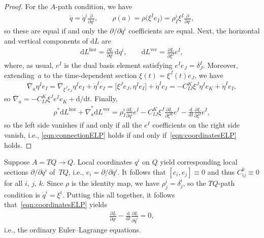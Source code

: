 \documentclass[pdftex]{sigma}
\numberwithin{equation}{section}
\begin{document}
\begin{proof}
 For the $A$-path condition, we have
 \begin{gather*}
 \dot{q} = \dot{q} ^i \frac{ \partial }{ \partial q ^i }, \qquad \rho(a) = \rho \big(\xi ^I e _I \big) = \rho ^i _I \xi ^I \frac{ \partial }{ \partial q ^i },
 \end{gather*}
 so these are equal if and only the $ \partial / \partial q ^i $ coef\/f\/icients are equal. Next, the horizontal and vertical components of $ \mathrm{d} L $ are
 \begin{gather*}
 \mathrm{d} L ^\text{hor} = \frac{ \partial L }{ \partial q ^i } \,\mathrm{d}q ^i , \qquad \mathrm{d} L ^\text{ver}= \frac{ \partial L }{ \partial \xi ^I } e ^I ,
 \end{gather*}
 where, as usual, $ e ^I $ is the dual basis element satisfying $ e ^I e _J = \delta ^I _J $. Moreover, extending~$a$ to the time-dependent section $ \xi (t) = \xi ^J (t) e _J $, we have
 \begin{gather*}
 \overline{ \nabla } _a \eta ^I e _I = \overline{ \nabla } _{ \xi ^J e _J } \eta ^I e _I + \dot{ \eta } ^I e _I= \big[ \xi ^J e _J , \eta ^I e _I \big] + \dot{ \eta } ^I e _I = - C _{ I J } ^K \xi ^J \eta ^I e _K + \dot{ \eta } ^I e _I ,
 \end{gather*}
 so $ \overline{ \nabla } _a = - C _{ I J } ^K \xi ^J e ^I e _K + \mathrm{d}/\mathrm{d}t $. Finally,
 \begin{gather*}
 \rho ^\ast \mathrm{d} L ^\text{hor} + \overline{ \nabla } _a ^\ast
 \mathrm{d} L ^\text{ver} = \rho ^i _I \frac{ \partial L }{ \partial q ^i } e ^I - C _{ I J } ^K \xi ^J \frac{ \partial L
 }{ \partial \xi ^K } e ^I - \frac{\mathrm{d}}{\mathrm{d}t} \frac{ \partial L }{ \partial \xi ^I } e ^I ,
 \end{gather*}
 so the left side vanishes if and only if all the $ e ^I $ coef\/f\/icients on the right side vanish, i.e., \eqref{eqn:connectionELP} holds if and only if~\eqref{eqn:coordinatesELP} holds.
\end{proof}

\begin{Example} \label{ex:tangentELP}
Suppose $ A = T Q \rightarrow Q $. Local coordinates $ q ^i $ on $Q$ yield corresponding local sections $ \partial / \partial q ^i $ of~$TQ$, i.e., $ e _i = \partial / \partial q ^i $. It follows that $ [ e _i , e _j ] \equiv 0 $ and thus $ C ^k _{ i j } \equiv 0 $ for all $ i$, $j$, $k $. Since $ \rho $ is the identity map, we have $ \rho ^i _j = \delta ^i _j $, so the $ T Q $-path condition is $ \dot{q} ^i = \xi ^i $. Putting this all together, it follows that~\eqref{eqn:coordinatesELP} yields
 \begin{gather*}
 \frac{ \partial L }{ \partial q ^i } - \frac{\mathrm{d}}{\mathrm{d}t} \frac{ \partial L }{ \partial \dot{q} ^i } = 0 ,
 \end{gather*}
 i.e., the ordinary Euler--Lagrange equations.
\end{Example}
\end{document}
